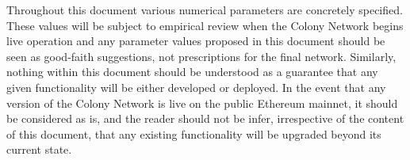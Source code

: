 Throughout this document various numerical parameters are concretely specified. These values will be subject to empirical review when the Colony Network begins live operation and any parameter values proposed in this document should be seen as good-faith suggestions, not prescriptions for the final network. Similarly, nothing within this document should be understood as a guarantee that any given functionality will be either developed or deployed. In the event that any version of the Colony Network is live on the public Ethereum mainnet, it should be considered as is, and the reader should not be infer, irrespective of the content of this document, that any existing functionality will be upgraded beyond its current state.
